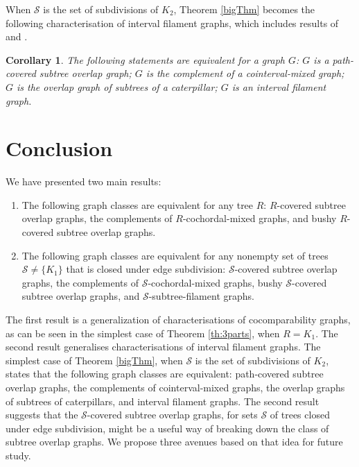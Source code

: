 \documentclass[
final
]{dmtcs-episciences}        \usepackage{graphics, amsthm, amsmath, amssymb, algorithm, algorithmic}
\newtheorem{corollary}{Corollary}
\begin{document}
When $\mathcal{S}$ is the set of subdivisions of $K_2$, Theorem \ref{bigThm} becomes the following characterisation of interval filament graphs, which includes results of \cite{CGO} and \cite{gavril2000}.

\begin{corollary}
The following statements are equivalent for a graph $G$:
$G$ is a path-covered subtree overlap graph;
$G$ is the complement of a cointerval-mixed graph;
$G$ is the overlap graph of subtrees of a caterpillar;
$G$ is an interval filament graph.
\end{corollary}


\section{Conclusion}

We have presented two main results: 

\begin{enumerate}
\item
The following graph classes are equivalent for any tree $R$: $R$-covered subtree overlap graphs, the complements of $R$-cochordal-mixed graphs, and bushy $R$-covered subtree overlap graphs.
\item
The following graph classes are equivalent for any nonempty set of trees $\mathcal{S} \ne \{K_1\}$ that is closed under edge subdivision:
$\mathcal{S}$-covered subtree overlap graphs,
the complements of $\mathcal{S}$-cochordal-mixed graphs,
bushy $\mathcal{S}$-covered subtree overlap graphs,
and $\mathcal{S}$-subtree-filament graphs.
\end{enumerate}

The first result is a generalization of characterisations of cocomparability graphs, as can be seen in the simplest case of Theorem \ref{th:3parts}, when $R = K_1$. 
The second result generalises characterisations of interval filament graphs. The simplest case of Theorem \ref{bigThm}, when $\mathcal{S}$ is the set of subdivisions of $K_2$, states that the following graph classes are equivalent: path-covered subtree overlap graphs, the complements of cointerval-mixed graphs, the overlap graphs of subtrees of caterpillars, and interval filament graphs.
The second result suggests that the $\mathcal{S}$-covered subtree overlap graphs, for sets $\mathcal{S}$ of trees closed under edge subdivision, might be a useful way of breaking down the class of subtree overlap graphs. We propose three avenues based on that idea for future study.
\end{document}
